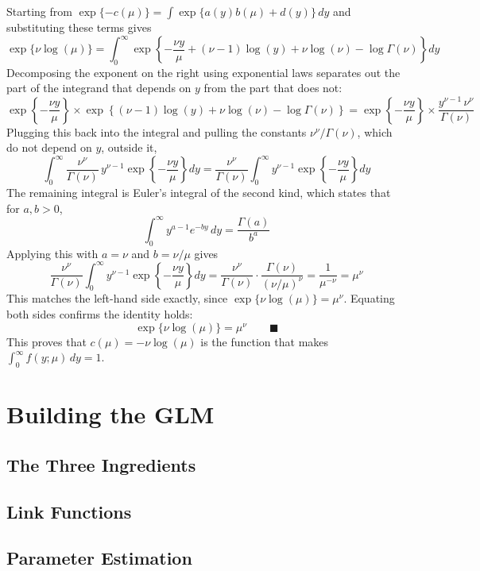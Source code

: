 \documentclass[12pt,a4paper]{report}
\begin{document}
Starting from $\exp\{-c(\mu)\} = \int \exp\{a(y)b(\mu) + d(y)\}\,dy$ and substituting these terms gives
\[
\exp\{\nu\log(\mu)\} = \int_0^{\infty} \exp\left\{-\frac{\nu y}{\mu} + (\nu-1)\log(y) + \nu\log(\nu) - \log\Gamma(\nu)\right\} dy
\]
Decomposing the exponent on the right using exponential laws separates out the part of the integrand that depends on $y$ from the part that does not:
\[
\exp\left\{-\frac{\nu y}{\mu}\right\} \times \exp\left\{(\nu-1)\log(y) + \nu\log(\nu) - \log\Gamma(\nu)\right\}
= \exp\left\{-\frac{\nu y}{\mu}\right\} \times \frac{y^{\nu-1}\,\nu^{\nu}}{\Gamma(\nu)}
\]
Plugging this back into the integral and pulling the constants $\nu^\nu/\Gamma(\nu)$, which do not depend on $y$, outside it,
\[
\int_0^{\infty} \frac{\nu^{\nu}}{\Gamma(\nu)}\, y^{\nu-1}\exp\left\{-\frac{\nu y}{\mu}\right\} dy
= \frac{\nu^{\nu}}{\Gamma(\nu)} \int_0^{\infty} y^{\nu-1}\exp\left\{-\frac{\nu y}{\mu}\right\} dy
\]
The remaining integral is Euler's integral of the second kind, which states that for $a,b > 0$,
\[
\int_0^{\infty} y^{a-1}e^{-by}\,dy = \frac{\Gamma(a)}{b^{a}}
\]
Applying this with $a = \nu$ and $b = \nu/\mu$ gives
\[
\frac{\nu^{\nu}}{\Gamma(\nu)} \int_0^{\infty} y^{\nu-1}\exp\left\{-\frac{\nu y}{\mu}\right\} dy = \frac{\nu^{\nu}}{\Gamma(\nu)}\cdot\frac{\Gamma(\nu)}{(\nu/\mu)^{\nu}} = \frac{1}{\mu^{-\nu}} = \mu^{\nu}
\]
This matches the left-hand side exactly, since $\exp\{\nu\log(\mu)\} = \mu^{\nu}$. Equating both sides confirms the identity holds:
\[
\exp\{\nu\log(\mu)\} = \mu^{\nu} \qquad \blacksquare
\]
This proves that $c(\mu) = -\nu\log(\mu)$ is the function that makes $\int_0^{\infty} f(y;\mu)\,dy = 1$.

\part{Building the GLM}

\chapter{The Three Ingredients}

\chapter{Link Functions}

\chapter{Parameter Estimation}
\end{document}

